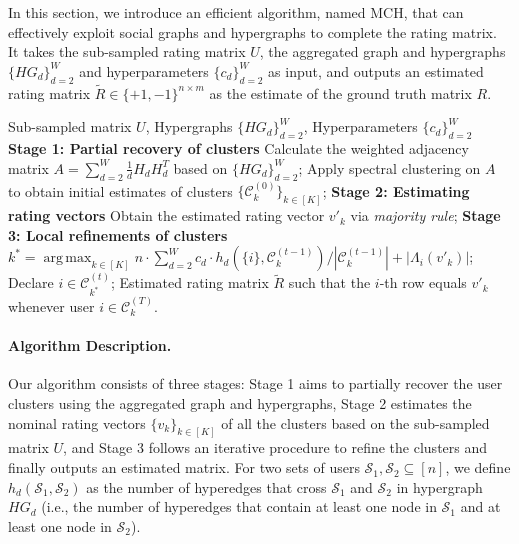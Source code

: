 \documentclass{article}
\DeclareMathOperator*{\argmax}{arg\,max}
\begin{document}
In this section, we introduce an efficient algorithm, named MCH, that can effectively exploit social graphs and hypergraphs to complete the rating matrix. It takes the sub-sampled rating matrix $U$, the aggregated graph and hypergraphs $\{ HG_d \}_{d=2}^{W}$ and hyperparameters $\{c_d\}_{d=2}^{W}$ as input, and outputs an estimated rating matrix $\widetilde{R} \in \{+1, -1\}^{n \times m}$ as the estimate of the ground truth matrix $R$. 

\renewcommand{\algorithmicrequire}{\textbf{Input}}
\renewcommand{\algorithmicensure}{\textbf{Output}}
\begin{algorithm}\label{alg1}
	\caption{MCH} 
	\begin{algorithmic}
		\REQUIRE Sub-sampled matrix $U$, Hypergraphs $\{HG_d \}_{d=2}^W$, Hyperparameters $\{c_d\}_{d=2}^{W}$
		\STATE \textbf{Stage 1: Partial recovery of clusters}
		\STATE Calculate the weighted adjacency matrix $A = \sum_{d=2}^W \frac{1}{d} H_d H_d^T$ based on  $\{HG_d \}_{d=2}^W$;
            \STATE Apply spectral clustering on $A$ to obtain initial estimates of clusters $\{\mathcal{C}^{(0)}_k\}_{k \in [K]}$;
		\STATE \textbf{Stage 2: Estimating rating vectors}
		\STATE Obtain the estimated rating vector $v'_k$ via \emph{majority rule};
		\ENDFOR
		\STATE \textbf{Stage 3: Local refinements of clusters}
		\STATE $  k^* = \argmax_{k \in [K]}	 n \cdot \sum_{d=2}^{W} c_d \cdot h_d (\{i\}, \mathcal{C}_k^{(t-1)})/|\mathcal{C}_{k}^{(t-1)}|  + |\Lambda_{i}(v'_k)|$;
            \STATE Declare $i \in \mathcal{C}_{k^*}^{(t)}$;
		\ENDFOR
		\ENDFOR
		\ENSURE Estimated rating matrix $\widetilde{R}$ such that the $i$-th row equals $v'_k$ whenever user $i \in \mathcal{C}_k^{(T)}$.
	\end{algorithmic}
\end{algorithm}

\paragraph{Algorithm Description.} 
Our algorithm consists of three stages: Stage 1 aims to partially recover the user clusters using the aggregated graph and hypergraphs, Stage 2  estimates the nominal rating vectors $\{v_k\}_{k \in [K]}$ of all the clusters based on the sub-sampled matrix $U$, and Stage 3 follows an iterative procedure to refine the clusters and finally outputs an estimated matrix.   For two sets of users $\mathcal{S}_1,\mathcal{S}_2 \subseteq [n]$, we define $h_d(\mathcal{S}_1, \mathcal{S}_2)$ as the number of hyperedges that cross $\mathcal{S}_1$ and $\mathcal{S}_2$ in hypergraph $HG_d$ (i.e., the number of hyperedges that contain at least one  node in $\mathcal{S}_1$ and at least one node in $\mathcal{S}_2$).
\end{document}

